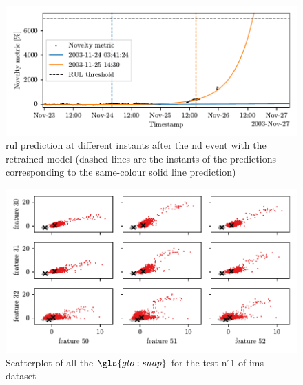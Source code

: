 \begin{figure}
    \centering
    \includegraphics{images/IMS/Novelty_01_500samples_bearing3x_predictions_retrained.pdf}
    \caption{\gls{rul} prediction at different instants after the \gls{nd} event with the retrained model (dashed lines are the instants of the predictions corresponding to the same-colour solid line prediction)}
    \label{fig:RULPredictions01_retrained}
\end{figure}

\begin{figure}
    \centering
    \includegraphics{images/IMS/Clusters_novelty.pdf}
    \caption{Scatterplot of all the $\gls{glo:snap}$ for the test $\text{n}^\circ$1 of \gls{ims} dataset}
    \label{fig:Clusters_novelty}
\end{figure}

